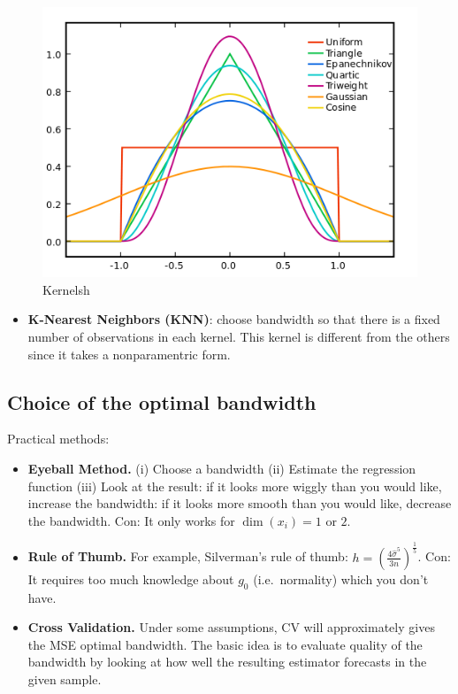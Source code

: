 \documentclass[12pt,]{book}
\providecommand{\tightlist}{%
  \setlength{\itemsep}{0pt}\setlength{\parskip}{0pt}}
\begin{document}
\begin{figure}
\centering
\includegraphics{figures/Fig_523.png}
\caption{Kernelsh}
\end{figure}

\begin{itemize}
\tightlist
\item
  \textbf{K-Nearest Neighbors (KNN)}: choose bandwidth so that there is a fixed number of observations in each kernel. This kernel is different from the others since it takes a nonparamentric form.
\end{itemize}

\hypertarget{choice-of-the-optimal-bandwidth}{%
\subsection{Choice of the optimal bandwidth}\label{choice-of-the-optimal-bandwidth}}

Practical methods:

\begin{itemize}
\item
  \textbf{Eyeball Method.} (i) Choose a bandwidth (ii) Estimate the regression function (iii) Look at the result: if it looks more wiggly than you would like, increase the bandwidth: if it looks more smooth than you would like, decrease the bandwidth. Con: It only works for \(\dim(x_i) = 1\) or \(2\).
\item
  \textbf{Rule of Thumb.} For example, Silverman's rule of thumb: \(h = \left( \frac{4 \hat{\sigma}^5}{3n} \right)^{\frac{1}{5}}\).
  Con: It requires too much knowledge about \(g_0\) (i.e.~normality) which you don't have.
\item
  \textbf{Cross Validation.} Under some assumptions, CV will approximately gives the MSE optimal bandwidth. The basic idea is to evaluate quality of the bandwidth by looking at how well the resulting estimator forecasts in the given sample.
\end{itemize}
\end{document}
